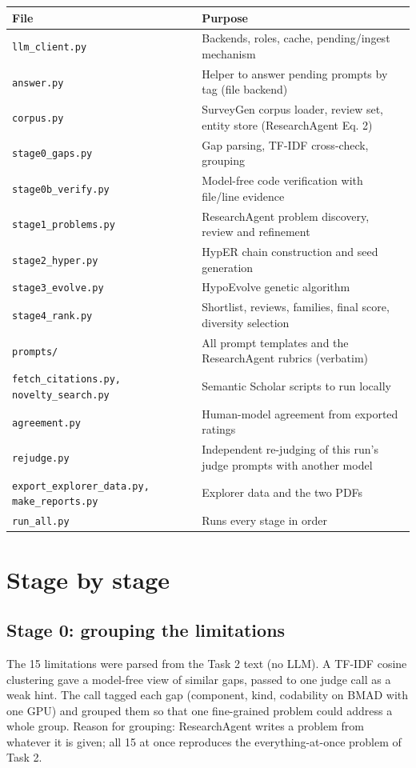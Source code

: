 \documentclass[11pt,a4paper]{article}
\begin{document}
\begin{tabularx}{\linewidth}{@{}l Y@{}}\toprule File & Purpose\\\midrule
\texttt{llm\_\allowbreak{}client.py} & Backends, roles, cache, pending/ingest mechanism\\
\texttt{answer.py} & Helper to answer pending prompts by tag (file backend)\\
\texttt{corpus.py} & SurveyGen corpus loader, review set, entity store (ResearchAgent Eq. 2)\\
\texttt{stage0\_\allowbreak{}gaps.py} & Gap parsing, TF-IDF cross-check, grouping\\
\texttt{stage0b\_\allowbreak{}verify.py} & Model-free code verification with file/line evidence\\
\texttt{stage1\_\allowbreak{}problems.py} & ResearchAgent problem discovery, review and refinement\\
\texttt{stage2\_\allowbreak{}hyper.py} & HypER chain construction and seed generation\\
\texttt{stage3\_\allowbreak{}evolve.py} & HypoEvolve genetic algorithm\\
\texttt{stage4\_\allowbreak{}rank.py} & Shortlist, reviews, families, final score, diversity selection\\
\texttt{prompts/} & All prompt templates and the ResearchAgent rubrics (verbatim)\\
\texttt{fetch\_\allowbreak{}citations.py, novelty\_\allowbreak{}search.py} & Semantic Scholar scripts to run locally\\
\texttt{agreement.py} & Human-model agreement from exported ratings\\
\texttt{rejudge.py} & Independent re-judging of this run's judge prompts with another model\\
\texttt{export\_\allowbreak{}explorer\_\allowbreak{}data.py, make\_\allowbreak{}reports.py} & Explorer data and the two PDFs\\
\texttt{run\_\allowbreak{}all.py} & Runs every stage in order\\
\bottomrule\end{tabularx}
\section{Stage by stage}
\subsection{Stage 0: grouping the limitations}
The 15 limitations were parsed from the Task 2 text (no LLM). A TF-IDF cosine clustering gave a model-free view of similar gaps, passed to one judge call as a weak hint. The call tagged each gap (component, kind, codability on BMAD with one GPU) and grouped them so that one fine-grained problem could address a whole group. Reason for grouping: ResearchAgent writes a problem from whatever it is given; all 15 at once reproduces the everything-at-once problem of Task 2.
\end{document}
